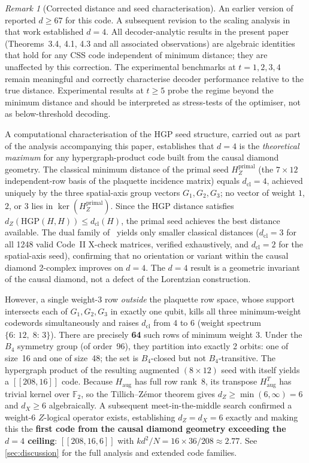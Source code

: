 \documentclass[12pt,a4paper]{article}
\theoremstyle{plain}
\theoremstyle{definition}
\theoremstyle{remark}
\newtheorem{remark}[theorem]{Remark}
\newcommand{\GFtwo}{\mathbb{F}_2}
\begin{document}
\begin{remark}[Corrected distance and seed characterisation]
\label{rem:d4_corrected}
An earlier version of~\cite{SchmittScale} reported $d\geq 67$ for this code.
A subsequent revision to the scaling analysis in that work established
$d=4$.
All decoder-analytic results in the present paper (Theorems~3.4, 4.1, 4.3
and all associated observations) are algebraic identities that hold for any
CSS code independent of minimum distance; they are unaffected by this
correction.
The experimental benchmarks at $t=1,2,3,4$ remain meaningful and
correctly characterise decoder performance relative to the true distance.
Experimental results at $t\geq 5$ probe the regime beyond the minimum
distance and should be interpreted as stress-tests of the optimiser, not
as below-threshold decoding.

A computational characterisation of the HGP seed structure, carried out
as part of the analysis accompanying this paper, establishes that $d=4$
is the \emph{theoretical maximum} for any hypergraph-product code built
from the causal diamond geometry.
The classical minimum distance of the primal seed
$H_Z^{\mathrm{primal}}$ (the $7\times 12$ independent-row basis of the
plaquette incidence matrix) equals $d_{\mathrm{cl}}=4$, achieved
uniquely by the three spatial-axis group vectors $G_1, G_2, G_3$; no
vector of weight $1$, $2$, or $3$ lies in $\ker(H_Z^{\mathrm{primal}})$.
Since the HGP distance satisfies
$d_Z(\mathrm{HGP}(H,H)) \leq d_{\mathrm{cl}}(H)$,
the primal seed achieves the best distance available.
The dual family of~\cite{SchmittCSS} yields only smaller classical
distances ($d_{\mathrm{cl}}=3$ for all 1248 valid Code~II X-check
matrices, verified exhaustively, and $d_{\mathrm{cl}}=2$ for the
spatial-axis seed), confirming that no orientation or variant within the
causal diamond 2-complex improves on $d=4$.
The $d=4$ result is a geometric invariant of the causal diamond, not a
defect of the Lorentzian construction.

However, a single weight-3 row \emph{outside} the plaquette row space,
whose support intersects each of $G_1, G_2, G_3$ in exactly one qubit,
kills all three minimum-weight codewords simultaneously and raises
$d_{\mathrm{cl}}$ from $4$ to $6$ (weight spectrum $\{6{:}\,12,\;
8{:}\,3\}$).
There are precisely \textbf{64} such rows of minimum weight 3.
Under the $B_4$ symmetry group (of order~96), they partition into
exactly 2 orbits: one of size~16 and one of size~48; the set is
$B_4$-closed but not $B_4$-transitive.
The hypergraph product of the resulting augmented $(8\times 12)$ seed
with itself yields a $[[208, 16]]$ code.
Because $H_{\mathrm{aug}}$ has full row rank~8, its transpose
$H_{\mathrm{aug}}^T$ has trivial kernel over $\GFtwo$, so the
Tillich--Z\'emor theorem gives $d_Z \geq \min(6,\infty)=6$ and
$d_X \geq 6$ algebraically.
A subsequent meet-in-the-middle search confirmed a weight-6
$Z$-logical operator exists, establishing $d_Z = d_X = 6$ exactly
and making this the \textbf{first code from the causal diamond geometry
exceeding the $d=4$ ceiling}: $[[208,16,6]]$ with
$k d^2/N = 16\times 36/208 \approx 2.77$.
See \cref{sec:discussion} for the full analysis and extended code families.
\end{remark}
\end{document}
